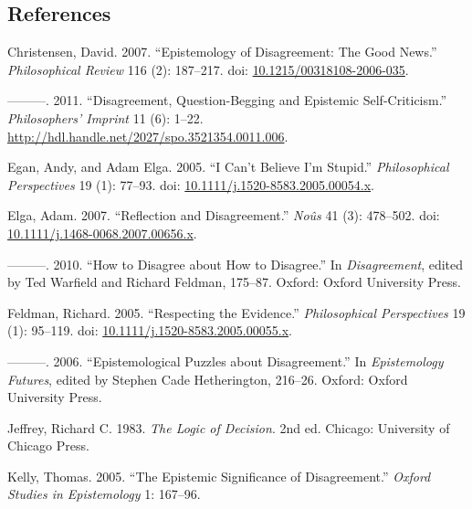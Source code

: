 \documentclass[
  10pt,
  letterpaper,
  DIV=11,
  numbers=noendperiod,
  twoside]{scrartcl}
\newlength{\cslhangindent}
\newenvironment{CSLReferences}[2] %
 {\begin{list}{}{%
  \setlength{\itemindent}{0pt}
  \setlength{\leftmargin}{0pt}
  \setlength{\parsep}{0pt}
  \ifodd #1
   \setlength{\leftmargin}{\cslhangindent}
   \setlength{\itemindent}{-1\cslhangindent}
  \fi
  \setlength{\itemsep}{#2\baselineskip}}}
 {\end{list}}
\begin{document}
\subsection*{References}\label{references}

\label{refs}
\begin{CSLReferences}{1}{0}
Christensen, David. 2007. {``Epistemology of Disagreement: The Good
News.''} \emph{Philosophical Review} 116 (2): 187--217. doi:
\href{https://doi.org/10.1215/00318108-2006-035}{10.1215/00318108-2006-035}.

---------. 2011. {``Disagreement, Question-Begging and Epistemic
Self-Criticism.''} \emph{Philosophers' Imprint} 11 (6): 1--22.
\url{http://hdl.handle.net/2027/spo.3521354.0011.006}.

Egan, Andy, and Adam Elga. 2005. {``{I Can't Believe I'm Stupid}.''}
\emph{Philosophical Perspectives} 19 (1): 77--93. doi:
\href{https://doi.org/10.1111/j.1520-8583.2005.00054.x}{10.1111/j.1520-8583.2005.00054.x}.

Elga, Adam. 2007. {``Reflection and Disagreement.''} \emph{No{û}s} 41
(3): 478--502. doi:
\href{https://doi.org/10.1111/j.1468-0068.2007.00656.x}{10.1111/j.1468-0068.2007.00656.x}.

---------. 2010. {``How to Disagree about How to Disagree.''} In
\emph{Disagreement}, edited by Ted Warfield and Richard Feldman,
175--87. Oxford: Oxford University Press.

Feldman, Richard. 2005. {``Respecting the Evidence.''}
\emph{Philosophical Perspectives} 19 (1): 95--119. doi:
\href{https://doi.org/10.1111/j.1520-8583.2005.00055.x}{10.1111/j.1520-8583.2005.00055.x}.

---------. 2006. {``Epistemological Puzzles about Disagreement.''} In
\emph{Epistemology Futures}, edited by Stephen Cade Hetherington,
216--26. Oxford: Oxford University Press.

Jeffrey, Richard C. 1983. \emph{The Logic of Decision}. 2nd ed. Chicago:
University of Chicago Press.

Kelly, Thomas. 2005. {``The Epistemic Significance of Disagreement.''}
\emph{Oxford Studies in Epistemology} 1: 167--96.


\end{CSLReferences}
\end{document}
